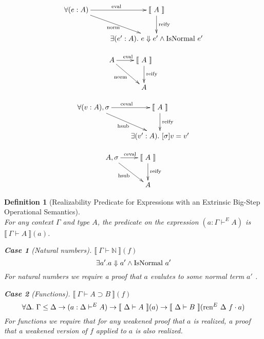 \documentclass[preprint,nonatbib]{sigplanconf}
\newtheorem{mydfn}{Definition}
\newtheorem{mysubdfn}{Case}
\numberwithin{mysubdfn}{mydfn}
\def\bigstep{\Downarrow}
\def\arr{\supset}
\def\marr{\rightarrow}
\def\app{\cdot}
\def\nat{\mathbb{N}}
\newcommand{\el}[1]{\llbracket ~ #1 ~ \rrbracket}
\newcommand{\fun}[1]{\textmd{#1}}
\newcommand{\typm}[1]{\el{\Gamma \vdash #1}}
\newcommand{\dtypm}[1]{\el{\Delta \vdash #1}}
\newcommand{\type}[1]{\Gamma \vdash^E #1}
\newcommand{\dtype}[1]{\Delta \vdash^E #1}
\newcommand{\ren}[1]{\Gamma \le #1}
\def\dren{\ren{\Delta}}
\begin{document}
\begin{displaymath}
    \xymatrix{
          {\forall (e : A)} 
          \ar[dr]_{\fun{norm}}
          \ar[r]^{\fun{eval}}
        & {\el{A}}
          \ar[d]^{\large{\fun{reify}}}
\\      & {\exists (e' : A). ~ e \bigstep e' \wedge \fun{IsNormal} ~ e'} }
\end{displaymath}

\begin{displaymath}
    \xymatrix{
          {A} 
          \ar[dr]_{\fun{norm}}
          \ar[r]^{\fun{eval}}
        & {\el{A}}
          \ar[d]^{\large{\fun{reify}}}
\\      & {A} }
\end{displaymath}


\begin{displaymath}
    \xymatrix{
          {\forall (v : A), \sigma} 
          \ar[dr]_{\fun{hsub}}
          \ar[r]^{\fun{ceval}}
        & {\el{A}}
          \ar[d]^{\large{\fun{reify}}}
\\      & {\exists (v' : A). ~ [ \sigma ] v = v'} }
\end{displaymath}

\begin{displaymath}
    \xymatrix{
          {A, \sigma} 
          \ar[dr]_{\fun{hsub}}
          \ar[r]^{\fun{ceval}}
        & {\el{A}}
          \ar[d]^{\large{\fun{reify}}}
\\      & {A} }
\end{displaymath}

\begin{mydfn}[Realizability Predicate for Expressions with an 
Extrinsic Big-Step Operational Semantics]
$ $\\
For any context $\Gamma$ and type $A$, the predicate on the expression
$(a : \type{A})$ is $\typm{A}(a)$.

\begin{mysubdfn}[Natural numbers]
$\typm{\nat}(f)$
$$
\exists a'. a \bigstep a' \wedge \fun{IsNormal} ~ a'
$$
For natural numbers we require a proof that $a$ evalutes to
some normal term $a'$ .
\end{mysubdfn}

\begin{mysubdfn}[Functions]
$\typm{A \arr B}(f)$
$$
\forall \Delta.~ \dren \marr (a : \dtype{A})
\marr \dtypm{A}(a) \marr \dtypm{B}(\fun{ren}^E ~ \Delta ~ f \app a)
$$
For functions we require that for any weakened proof that $a$
is realized, a proof that a weakened version of $f$ applied to
$a$ is also realized.
\end{mysubdfn}

\end{mydfn}
\end{document}
